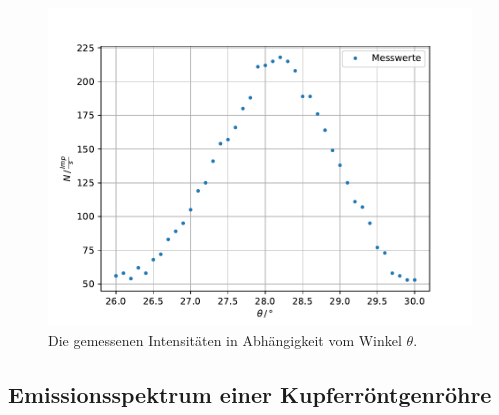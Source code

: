 \begin{figure}
    \centering
    \includegraphics[width=\textwidth]{content/data/absorption1.pdf}
    \caption{Die gemessenen Intensitäten in Abhängigkeit vom Winkel $\theta$.}
    \label{fig:bragg}
\end{figure}
\FloatBarrier

\subsection{Emissionsspektrum einer Kupferröntgenröhre}


